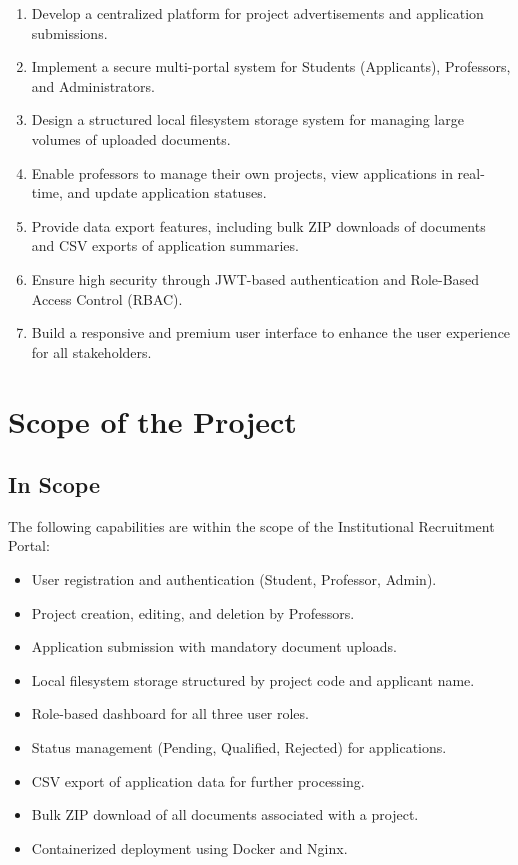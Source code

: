 \begin{enumerate}
  \item Develop a centralized platform for project advertisements and application submissions.
  
  \item Implement a secure multi-portal system for Students (Applicants), Professors, and Administrators.
  
  \item Design a structured local filesystem storage system for managing large volumes of uploaded documents.
  
  \item Enable professors to manage their own projects, view applications in real-time, and update application statuses.
  
  \item Provide data export features, including bulk ZIP downloads of documents and CSV exports of application summaries.
  
  \item Ensure high security through JWT-based authentication and Role-Based Access Control (RBAC).
  
  \item Build a responsive and premium user interface to enhance the user experience for all stakeholders.
\end{enumerate}

\section{Scope of the Project}

\subsection{In Scope}

The following capabilities are within the scope of the Institutional Recruitment Portal:

\begin{itemize}
  \item User registration and authentication (Student, Professor, Admin).
  \item Project creation, editing, and deletion by Professors.
  \item Application submission with mandatory document uploads.
  \item Local filesystem storage structured by project code and applicant name.
  \item Role-based dashboard for all three user roles.
  \item Status management (Pending, Qualified, Rejected) for applications.
  \item CSV export of application data for further processing.
  \item Bulk ZIP download of all documents associated with a project.
  \item Containerized deployment using Docker and Nginx.
\end{itemize}

